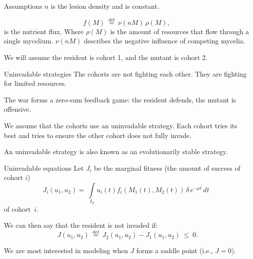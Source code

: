 \documentclass{beamer}
\begin{document}
\begin{frame}{Assumptions}
    $n$ is the lesion density and is constant. \newline
    
    $$
    f(M) \: \stackrel{\mathrm{def}}{=} \: \nu(n M) \, \rho(M),
    $$
    is the nutrient flux. Where $\rho(M)$ is the amount of resources that flow through a single mycelium. $ \nu(n M) $ describes the negative influence of competing mycelia. \newline
    
    We will assume the resident is cohort 1, and the mutant is cohort 2.
\end{frame}

\begin{frame}{Uninvadable strategies}
    The cohorts are not fighting each other. They are fighting for limited resources. \newline
    
    The war forms a zero-sum feedback game: the resident defends, the mutant is offensive. \newline
    
    We assume that the cohorts use an uninvadable strategy. Each cohort tries its best and tries to ensure the other cohort does not fully invade. \newline
    
    An uninvadable strategy is also known as an evolutionarily stable strategy.
\end{frame}


\begin{frame}{Uninvadable equations}
    Let $ J_i $ be the marginal fitness (the amount of success of cohort $i$)
    $$J_i(u_1, u_2) = \: \int\limits_{I_T} u_i(t) f_i(M_1(t), M_2(t)) \, \delta \, e^{-\mu t} \, dt \: $$ of cohort~$ i $. \newline
    
    We can then say that the resident is not invaded if: $$ \: J(u_1, u_2) \: \stackrel{\mathrm{def}}{=} \: J_2(u_1, u_2) - J_1(u_1, u_2) \: \leqslant \: 0. $$ \newline
    
    We are most interested in modeling when $J$ forms a saddle point (i.e., $J = 0$).
    
\end{frame}
\end{document}
